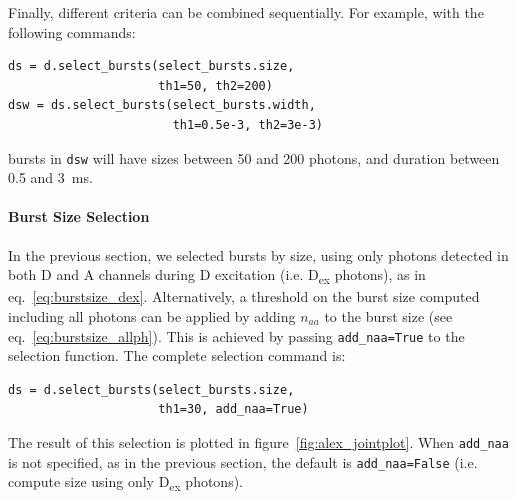 \documentclass[10pt,letterpaper]{article}
\begin{document}
Finally, different criteria can be combined sequentially.
For example, with the following commands:

\begin{lstlisting}
ds = d.select_bursts(select_bursts.size,
                     th1=50, th2=200)
dsw = ds.select_bursts(select_bursts.width,
                       th1=0.5e-3, th2=3e-3)
\end{lstlisting}

\noindent bursts in \verb|dsw|
will have sizes between 50 and 200 photons, and duration between 0.5 and 3~ms.

\paragraph*{Burst Size Selection}
In the previous section, we selected bursts by size, using only
photons detected in both D and A channels during D excitation (i.e. D\textsubscript{ex} photons),
as in eq.~\ref{eq:burstsize_dex}.
Alternatively, a threshold on the burst size computed including all photons
can be applied by adding $n_{aa}$ to the burst size (see eq.~\ref{eq:burstsize_allph}).
This is achieved
by passing \verb|add_naa=True| to the selection function.
The complete selection command is:

\begin{lstlisting}
ds = d.select_bursts(select_bursts.size,
                     th1=30, add_naa=True)
\end{lstlisting}

The result of this selection is plotted in figure~\ref{fig:alex_jointplot}.
When \verb|add_naa| is not specified,
as in the previous section, the default is \verb|add_naa=False|
(i.e. compute size using only D\textsubscript{ex} photons).
\end{document}
